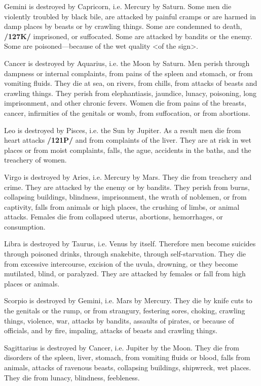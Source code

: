 Gemini \mn{\Gemini} is destroyed by Capricorn, i.e. Mercury by Saturn. Some men die violently troubled by black bile, are attacked by painful cramps or are harmed in damp places by beasts or by crawling things. Some are condemned to death, \textbf{/127K/} imprisoned, or suffocated. Some are attacked by bandits or the enemy. Some are poisoned—because of the wet quality <of the sign>.

Cancer \mn{\Cancer} is destroyed by Aquarius, i.e. the Moon by Saturn. Men perish through dampness or internal complaints, from pains of the spleen and stomach, or from vomiting fluids. They die at sea, on rivers, from chills, from attacks of beasts and crawling things. They perish from elephantiasis, jaundice, lunacy, poisoning, long imprisonment, and other chronic fevers. Women die from pains of the breasts, cancer, infirmities of the genitals or womb, from suffocation, or from abortions.

Leo \mn{\Leo} is destroyed by Pisces, i.e. the Sun by Jupiter. As a result men die from heart attacks \textbf{/121P/} and from complaints of the liver. They are at risk in wet places or from moist complaints, falls, the ague, accidents in the baths, and the treachery of women.

Virgo \mn{\Virgo} is destroyed by Aries, i.e. Mercury by Mars. They die from treachery and crime. They are attacked by the enemy or by bandits. They perish from burns, collapsing buildings, blindness, imprisonment, the wrath of noblemen, or from captivity, falls from animals or high places, the crushing of limbs, or animal attacks. Females die from collapsed uterus, abortions, hemorrhages, or consumption.

Libra is destroyed by Taurus, i.e. Venus by itself. Therefore men become suicides through poisoned drinks, through snakebite, through self-starvation. They die from excessive intercourse, excision of the uvula, drowning, or they become mutilated, blind, or paralyzed. They are attacked by females or fall from high places or animals.

Scorpio \mn{\Scorpio} is destroyed by Gemini, i.e. Mars by Mercury. They die by knife cuts to the genitals or the rump, or from strangury, festering sores, choking, crawling things, violence, war, attacks by bandits, assaults of pirates, or because of officials, and by fire, impaling, attacks of beasts and crawling things.

Sagittarius \mn{\Sagittarius} is destroyed by Cancer, i.e. Jupiter by the Moon. They die from disorders of the spleen, liver, stomach, from vomiting fluids or blood, falls from animals, attacks of ravenous beasts, collapsing buildings, shipwreck, wet places. They die from lunacy, blindness, feebleness. 

